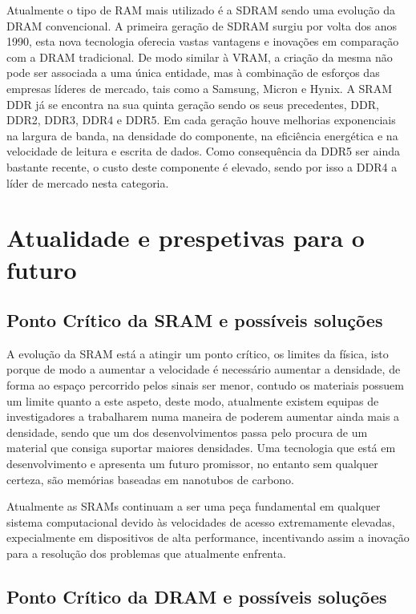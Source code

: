\documentclass{report}
\begin{document}
\par Atualmente o tipo de \ac{RAM} mais utilizado é a \ac{SDRAM} sendo uma evolução da \ac{DRAM} convencional. A primeira geração de \ac{SDRAM} surgiu por volta dos anos 1990, esta nova tecnologia oferecia vastas vantagens e inovações em comparação com a \ac{DRAM} tradicional. De modo similar à \ac{VRAM}, a criação da mesma não pode ser associada a uma única entidade, mas à combinação de esforços das empresas líderes de mercado, tais como a Samsung, Micron e Hynix. A \ac{SRAM} DDR já se encontra na sua quinta geração sendo os seus precedentes, DDR, DDR2, DDR3, DDR4 e DDR5. Em cada geração houve melhorias exponenciais na largura de banda, na densidade do componente, na eficiência energética e na velocidade de leitura e escrita de dados. Como consequência da DDR5 ser ainda bastante recente, o custo deste componente é elevado, sendo por isso a DDR4 a líder de mercado nesta categoria.



\chapter{Atualidade e prespetivas para o futuro}
\label{chap.atualidade}
\section{Ponto Crítico da \ac{SRAM} e possíveis soluções}

\par A evolução da \ac{SRAM} está a atingir um ponto crítico, os limites da física, isto porque de modo a aumentar a velocidade é necessário aumentar a densidade, de forma ao espaço percorrido pelos sinais ser menor, contudo os materiais possuem um limite quanto a este aspeto, deste modo, atualmente existem equipas de investigadores a trabalharem numa maneira de poderem aumentar ainda mais a densidade, sendo que um dos desenvolvimentos passa pelo procura de um material que consiga suportar maiores densidades. Uma tecnologia que está em desenvolvimento e apresenta um futuro promissor, no entanto sem qualquer certeza, são memórias baseadas em nanotubos de carbono.
\par Atualmente as \ac{SRAM}s continuam a ser uma peça fundamental em qualquer sistema computacional devido às velocidades de acesso extremamente elevadas, expecialmente em dispositivos de alta performance, incentivando assim a inovação para a resolução dos problemas que atualmente enfrenta.

\section{Ponto Crítico da \ac{DRAM} e possíveis soluções}
\end{document}
